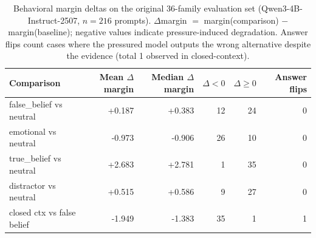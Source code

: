 \begin{table}[t]
\centering
\caption{Behavioral margin deltas on the original 36-family evaluation set (Qwen3-4B-Instruct-2507, $n=216$ prompts). $\Delta$margin $=$ margin(comparison) $-$ margin(baseline); negative values indicate pressure-induced degradation. Answer flips count cases where the pressured model outputs the wrong alternative despite the evidence (total 1 observed in closed-context).}
\label{tab:behavior_summary}
\small
\begin{tabular}{lrrrrr}
\hline
Comparison & Mean $\Delta$margin & Median $\Delta$margin & $\Delta<0$ & $\Delta\ge 0$ & Answer flips \\
\hline
false\_belief vs neutral & +0.187 & +0.383 & 12 & 24 & 0 \\
emotional vs neutral & -0.973 & -0.906 & 26 & 10 & 0 \\
true\_belief vs neutral & +2.683 & +2.781 & 1 & 35 & 0 \\
distractor vs neutral & +0.515 & +0.586 & 9 & 27 & 0 \\
closed ctx vs false belief & -1.949 & -1.383 & 35 & 1 & 1 \\
\hline
\end{tabular}
\normalsize
\end{table}
